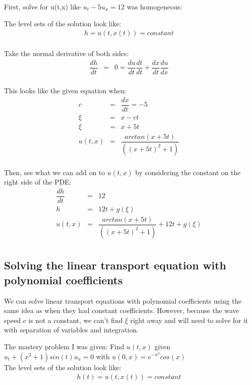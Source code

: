 \documentclass{article}
\newcommand{\bea}{\begin{eqnarray*}}
\newcommand{\eea}{\end{eqnarray*}}
\newcommand{\red}[1]{\textcolor{red}{#1}}
\begin{document}
First, solve for u(t,x) like $u_t-5u_x=12$ was homogeneous:\newline 

The level sets of the solution look like:
\bea
h = u(t,x(t)) = constant \\
\eea

Take the normal derivative of both sides:
\bea
\dfrac{dh}{dt} &=& 0  = \dfrac{du}{dt}\dfrac{dt}{dt} + \dfrac{dx}{dt}\dfrac{du}{dx}\\
\eea

This looks like the given equation when:
\bea
c &=& \dfrac{dx}{dt} = -5 \\
\xi &=& x-ct \\
\xi &=& x+5t  \\
u(t,x) &=& \dfrac{arctan(x+5t)}{((x+5t)^2+1)}  \\
\eea

Then, see what we can add on to $u(t,x)$ by considering the constant on the right side of the PDE:\\
\bea
\dfrac{dh}{dt} &=& 12 \\
h &=& 12t + g(\xi) \\ 
u(t,x) &=& \dfrac{arctan(x+5t)}{((x+5t)^2+1)} + 12t + g(\xi) \\
\eea



\subsection{Solving the linear transport equation with polynomial coefficients}
We can solve linear transport equations with polynomial coefficients using the same idea as when they had constant coefficients. However, because the wave speed $c$ is not a constant, we can't find $\xi$ right away and will need to solve for it with separation of variables and integration. \newline

The mastery problem I was given: Find $u(t,x)$ given $u_t+(x^2+1)sin(t)u_x=0$ with $u(0,x) = e^{-x^2}cos(x)$ \\

The level sets of the solution look like:
\bea
h(t) = u(t,x(t)) = constant\\
\eea
\end{document}
